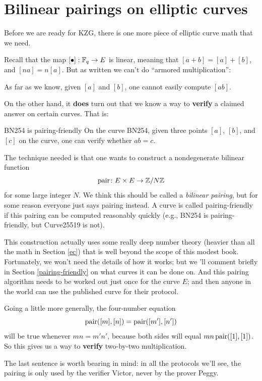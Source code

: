 \section{Bilinear pairings on elliptic curves}\label{pair}

Before we are ready for KZG, there is one more piece of elliptic curve
math that we need.

Recall that the map $[ \bullet ]:\mathbb{F}_{q} \rightarrow E$ is linear,
meaning that
$[a + b] = [a] + [b]$, and $[na] = n [a]$.
But as written we can't do ``armored multiplication'':

\begin{claim}{}{}
As far as we know, given $[a]$ and $[b]$, one cannot easily compute $[a b]$.
\end{claim}

On the other hand, it \textbf{does} turn out that we know a way to
\textbf{verify} a claimed answer on certain curves. That is:

\begin{proposition}{BN254 is pairing-friendly}{}
  On the curve BN254, given three points $[a]$,
  $[b]$, and $[c]$ on the curve, one can verify whether $ab = c$.
\end{proposition}

The technique needed is that one wants to construct a nondegenerate
bilinear function
\[ \operatorname{pair} \colon E \times E \to \mathbb{Z}/N\mathbb{Z} \]
for some large integer $N$.
We think this should be called a \emph{bilinear pairing},
but for some reason everyone just says \alert{pairing} instead.
A curve is called \alert{pairing-friendly} if
this pairing can be computed reasonably quickly
(e.g., BN254 is pairing-friendly, but Curve25519 is not).

This construction actually uses some really deep number theory
(heavier than all the math in Section \ref{ec})
that is well beyond the scope of this modest book.
Fortunately, we won't need the details of how it works;
but we 'll comment briefly in Section \ref{pairing-friendly} on what curves it
can be done on.
And this pairing algorithm needs to be worked out just
once for the curve $E$;
and then anyone in the world can use the published curve for their protocol.

Going a little more generally, the four-number equation
\[ \operatorname{pair}([m],[n]) = \operatorname{pair}([m'],[n']) \]
will be true whenever $mn = m'n'$, because both sides will equal
$mn \operatorname{pair}([1], [1])$.
So this gives us a way to \textbf{verify} two-by-two multiplication.

\begin{remark}{}{}
The last sentence is worth bearing in mind: in all the protocols we'll see,
the pairing is only used by the verifier Victor, never by the prover Peggy.
\end{remark}

